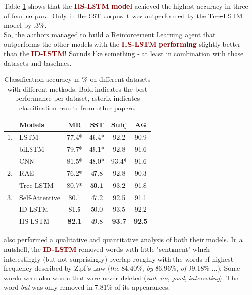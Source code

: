 \documentclass{article}
\begin{document}
Table \ref{tab:results} shows that the \textcolor{Maroon}{\textbf{HS-LSTM model}} achieved the highest accuracy in three of four corpora. Only in the SST corpus it was outperformed by the Tree-LSTM model by .3\%.\\ So, the authors managed to build a Reinforcement Learning agent that outperforms the other models with the \textcolor{Maroon}{\textbf{HS-LSTM performing}} slightly better than the \textcolor{Maroon}{\textbf{ID-LSTM}}! Sounds like something - at least in combination with those datasets and baselines.

\begin{table}[h]
    \centering
    \begin{tabular}{ll|cccc}
    \hline
         & Models & MR & SST & Subj & AG  \\
         \hline
         1. &LSTM & 77.4* & 46.4* & 92.2 & 90.9 \\
            &biLSTM & 79.7* & 49.1* & 92.8 & 91.6 \\
            &CNN & 81.5* & 48.0* & 93.4* & 91.6 \\
         \hline
         2. &RAE & 76.2* & 47.8 & 92.8 & 90.3 \\
            &Tree-LSTM & 80.7* & \textbf{50.1} & 93.2 & 91.8 \\
         \hline
        3.  &Self-Attentive & 80.1 & 47.2 & 92.5 & 91.1\\
        \hline
            &ID-LSTM & 81.6 & 50.0 & 93.5 & 92.2 \\
            &HS-LSTM & \textbf{82.1} & 49.8 & \textbf{93.7} & \textbf{92.5}\\
        \hline
         
    \end{tabular}
    \caption{Classification accuracy in \% on different datasets with different methods. Bold indicates the best performance per dataset, asterix indicates classification results from other papers.}
    \label{tab:results}
\end{table}

\cite{zhang2018} also performed a qualitative and quantitative analysis of both their models. In a nutshell, the \textcolor{Maroon}{\textbf{ID-LSTM}} removed words with little "sentiment" which interestingly (but not surprisingly) overlap roughly with the words of highest frequency described by Zipf's Law (\textit{the} 84.40\%, \textit{by} 86.96\%, \textit{of} 99.18\% ...). Some words were also words that were never deleted (\textit{not}, \textit{no}, \textit{good}, \textit{interesting}). The word \textit{but} was only removed in 7.81\% of its appearances.\par
\end{document}

